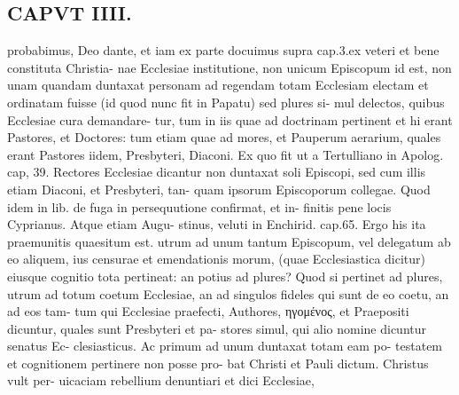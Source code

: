 \documentclass{article}
\begin{document}
\begin{pages}
\section*{CAPVT  IIII. }
\marginpar{[ p.241 ]}probabimus, Deo dante, et iam ex parte docuimus supra cap.3.ex veteri et bene constituta Christia- nae Ecclesiae institutione, non unicum Episcopum id est, non unam quandam duntaxat personam ad regendam totam Ecclesiam electam et ordinatam fuisse (id quod nunc fit in Papatu) sed plures si- mul delectos, quibus Ecclesiae cura demandare- tur, tum in iis quae ad doctrinam pertinent et hi erant Pastores, et Doctores: tum etiam quae ad mores, et Pauperum aerarium, quales erant Pastores iidem, Presbyteri, Diaconi. Ex quo fit ut a Tertulliano in Apolog. cap, 39. Rectores Ecclesiae dicantur non duntaxat soli Episcopi, sed cum illis etiam Diaconi, et Presbyteri, tan- quam ipsorum Episcoporum collegae. Quod idem in lib. de fuga in persequutione confirmat, et in- finitis pene locis Cyprianus. Atque etiam Augu- stinus, veluti in Enchirid. cap.65. Ergo his ita praemunitis quaesitum est. utrum ad unum tantum Episcopum, vel delegatum ab eo aliquem, ius censurae et emendationis morum, (quae Ecclesiastica dicitur) eiusque cognitio tota pertineat: an potius ad plures? Quod si pertinet ad plures, utrum ad totum coetum Ecclesiae, an ad singulos fideles qui sunt de eo coetu, an ad eos tam- tum qui Ecclesiae praefecti, Authores, ηγομένος, et Praepositi dicuntur, quales sunt Presbyteri et pa- stores simul, qui alio nomine dicuntur senatus Ec- clesiasticus. Ac primum ad unum duntaxat totam eam po- testatem et cognitionem pertinere non posse pro- bat Christi et Pauli dictum. Christus vult per- uicaciam rebellium denuntiari et dici Ecclesiae, 

\end{pages}
\end{document}
